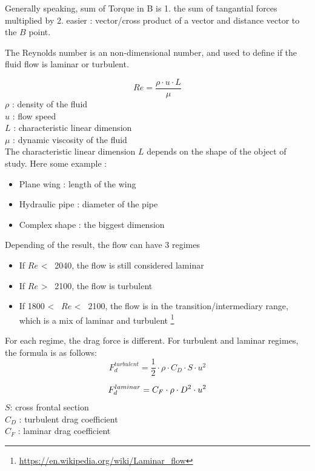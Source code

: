 \documentclass[12pt,a4paper]{article}
\begin{document}
	Generally speaking, sum of Torque in B is 
	1. the sum of tangantial forces multiplied by
	2. easier : vector/cross product of a vector and distance vector to the $B$ point.  
	
	The Reynolds number is an non-dimensional number, and used to define if the fluid flow is laminar or turbulent. 
	
	\begin{equation}
		Re = \frac{\rho \cdot u \cdot L}{\mu}
	\end{equation}
	$\rho$ : density of the fluid\\
	$u$ : flow speed\\
	$L$ : characteristic linear dimension\\
	$\mu$ : dynamic viscosity of the fluid\\
	
	The characteristic linear dimension $L$ depends on the shape of the object of study. Here some example : 
	\begin{itemize}
		\item Plane wing : length of the wing
		\item Hydraulic pipe : diameter of the pipe
		\item Complex shape : the biggest dimension
	\end{itemize}
	Depending of the result, the flow can have 3 regimes
	
	\begin{itemize}
		\item If $Re$ <~ 2040, the flow is still considered laminar 
		\item If $Re$ >~ 2100, the flow is turbulent
		\item If 1800 <~ $Re$ <~ 2100, the flow is in the transition/intermediary range, which is a mix of laminar and turbulent \footnote{\url{https://en.wikipedia.org/wiki/Laminar_flow}}
	\end{itemize}
	
	For each regime, the drag force is different. 
	For turbulent and laminar regimes, the formula is as follows:
	\begin{equation}
		F_d^{turbulent} = \frac{1}{2} \cdot \rho \cdot C_D \cdot S \cdot u^2
	\end{equation}
	
	\begin{equation}
		F_d^{laminar} = C_F \cdot \rho \cdot  D^2 \cdot u^2\\
	\end{equation}
	$S$: cross frontal section\\
	$C_D$ : turbulent drag coefficient\\
	$C_F$ : laminar drag coefficient\\
	
\end{document}
